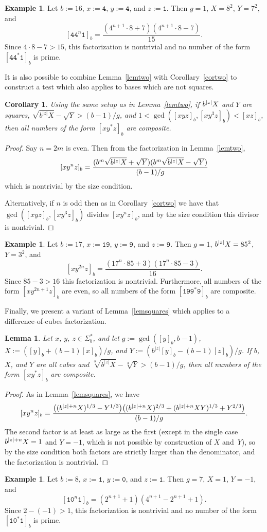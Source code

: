 \documentclass[12pt]{article}
\DeclarePairedDelimiter\abs{\lvert}{\rvert}
\theoremstyle{plain}
\newtheorem{corollary}[theorem]{Corollary}
\newtheorem{lemma}[theorem]{Lemma}
\theoremstyle{definition}
\newtheorem{example}[theorem]{Example}
\theoremstyle{remark}
\newcommand{\0}{\mathtt{0}}
\newcommand{\1}{\mathtt{1}}
\newcommand{\2}{\mathtt{2}}
\newcommand{\3}{\mathtt{3}}
\newcommand{\4}{\mathtt{4}}
\newcommand{\5}{\mathtt{5}}
\newcommand{\6}{\mathtt{6}}
\newcommand{\7}{\mathtt{7}}
\newcommand{\8}{\mathtt{8}}
\newcommand{\9}{\mathtt{9}}
\begin{document}
\begin{example}
Let $b:=16$, $x:=\4$, $y:=\4$, and $z:=\1$.  Then $g=1$, $X=8^2$, $Y=7^2$, and
\[ [\4\4^n\1]_b = \frac{(4^{n+1}\cdot8+7)(4^{n+1}\cdot8-7)}{15} . \]
Since $4\cdot8-7>15$, this factorization is nontrivial and no number of 
the form $[\4\4^*\1]_b$ is prime.
\end{example}

It is also possible to combine Lemma~\ref{lemtwo} with Corollary~\ref{cortwo} 
to construct a test which also applies to bases which are not squares.
\begin{corollary}
Using the same setup as in Lemma~\ref{lemtwo}, if\/ $b^{\abs{z}}X$ and $Y$ 
are squares, $\sqrt{b^{\lvert z\rvert}X}-\sqrt{Y}>(b-1)/g$, and
$1<\gcd([xyz]_b,[xy^3z]_b)<[xz]_b$, then all numbers of the form $[xy^*z]_b$ 
are composite.
\end{corollary}
\begin{proof}
Say $n=2m$ is even.  Then from the factorization in Lemma~\ref{lemtwo},
\[ [xy^nz]_b = \frac{(b^m\sqrt{b^{\abs{z}}X}+\sqrt{Y})(b^m\sqrt{b^{\abs{z}}X}-\sqrt{Y})}{(b-1)/g} \]
which is nontrivial by the size condition.

Alternatively, if $n$ is odd then as in Corollary~\ref{cortwo} we have that 
$\gcd([xyz]_b,[xy^3z]_b)$ divides $[xy^nz]_b$, and by the size condition this 
divisor is nontrivial.
\end{proof}
\begin{example}
Let $b:=17$, $x:=\1\9$, $y:=\9$, and $z:=\9$.  Then $g=1$, 
$b^{\abs{z}}X=85^2$, $Y=3^2$, and
\[ [xy^{2n}z]_b = \frac{(17^n\cdot85+3)(17^n\cdot85-3)}{16} . \]
Since $85-3>16$ this factorization is nontrivial.  Furthermore, all numbers 
of the form $[xy^{2n+1}z]_b$ are even, so all numbers of the form 
$[\1\9\9^*\9]_b$ are composite.
\end{example}
Finally, we present a variant of Lemma~\ref{lemsquares} which applies to a 
difference-of-cubes factorization.
\begin{lemma}\label{lemcubes}
Let $x$, $y$, $z\in\Sigma^*_b$, and let $g:=\gcd([y]_b,b-1)$, 
$X:=([y]_b+(b-1)[x]_b)/g$, and $Y:=(b^{\lvert{z}\rvert}[y]_b-(b-1)[z]_b)/g$.
If\/ $b$, $X$, and $Y$ are all cubes and 
$\sqrt[3]{b^{\lvert z\rvert}X}-\sqrt[3]{Y}>(b-1)/g$, then all numbers of 
the form
 $[xy^*z]_b$ are composite.
\end{lemma}
\begin{proof}
As in Lemma~\ref{lemsquares}, we have
\[ [xy^nz]_b = \frac{\bigl((b^{\abs{z}+n}X)^{1/3}-Y^{1/3}\bigr)\bigl((b^{\abs{z}+n}X)^{2/3}+(b^{\abs{z}+n}XY)^{1/3}+Y^{2/3}\bigr)}{(b-1)/g} . \]
The second factor is at least as large as the first (except in the 
single case $b^{\abs{z}+n}X=1$ and $Y=-1$, which is not possible by 
construction of $X$ and~$Y$),
so by the size condition both factors are strictly larger than the 
denominator, and the factorization is nontrivial.
\end{proof}
\begin{example}
Let $b:=8$, $x:=\1$, $y:=\0$, and $z:=\1$.  Then $g=7$, $X=1$, $Y=-1$, and
\[ [\1\0^n\1]_b = (2^{n+1}+1)(4^{n+1}-2^{n+1}+1) . \]
Since $2-(-1)>1$, this factorization is nontrivial and no number of the 
form $[\1\0^*\1]_b$ is prime.
\end{example}
\end{document}

